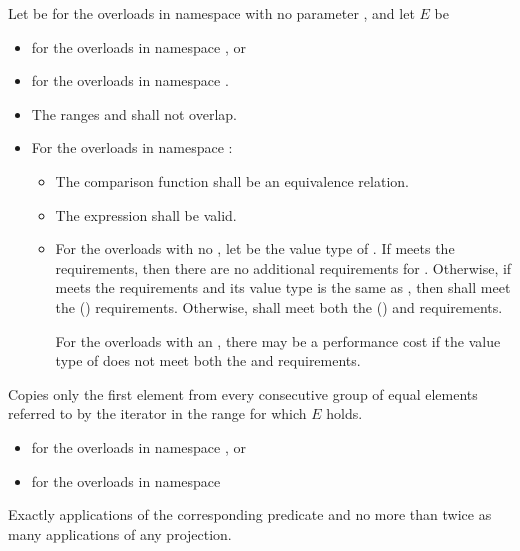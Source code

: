 \begin{itemdescr}
\pnum
Let  be  for the overloads
in namespace  with no parameter , and
let $E$ be
\begin{itemize}
\setlength{\emergencystretch}{1em}
\item
  for the overloads in namespace , or
\item
  for the overloads in namespace .
\end{itemize}

\pnum
\requires
\begin{itemize}
\item
  The ranges  and 
  shall not overlap.
\item
  For the overloads in namespace :
  \begin{itemize}
  \item
    The comparison function shall be an equivalence relation.
  \item
    The expression  shall be valid.
  \item
    For the overloads with no ,
    let  be the value type of .
    If  meets
    the  requirements,
    then there are no additional requirements for .
    Otherwise, if  meets
    the  requirements and
    its value type is the same as ,
    then  shall meet
    the  () requirements.
    Otherwise,  shall meet both
    the  () and
     requirements.
    \begin{note}
    For the overloads with an ,
    there may be a performance cost
    if the value type of  does not meet both the
     and  requirements.
    \end{note}
  \end{itemize}
\end{itemize}

\pnum
\effects
Copies only the first element from every consecutive group of equal elements
referred to by the iterator  in the range 
for which $E$ holds.

\pnum
\returns
\begin{itemize}
\item {} for the overloads in namespace , or
\item {} for the overloads in namespace 
\end{itemize}

\pnum
\complexity
Exactly  applications
of the corresponding predicate
and no more than twice as many applications of any projection.
\end{itemdescr}

